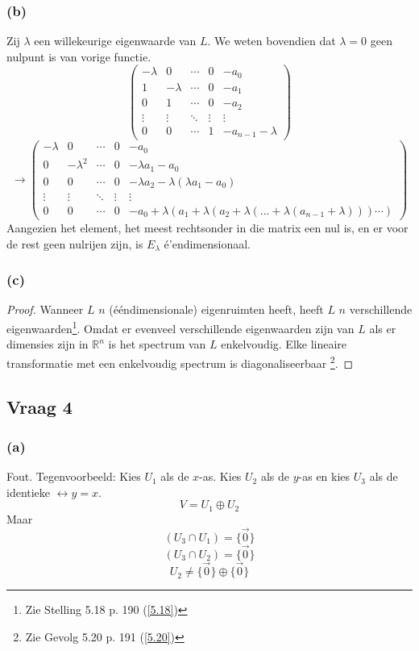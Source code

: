 \documentclass[lineaire_algebra_oplossingen.tex]{subfiles}
\begin{document}
\subsubsection*{(b)}
Zij $\lambda$ een willekeurige eigenwaarde van $L$. We weten bovendien dat $\lambda = 0$ geen nulpunt is van vorige functie.
\[
\begin{pmatrix}
-\lambda & 0 & \cdots & 0 & -a_0\\
1 & -\lambda & \cdots & 0 & -a_1\\
0 & 1 & \cdots & 0 & -a_2\\
\vdots & \vdots & \ddots & \vdots & \vdots\\
0 & 0 & \cdots & 1 & -a_{n-1}-\lambda
\end{pmatrix}
\]
\[
\rightarrow
\begin{pmatrix}
-\lambda & 0 & \cdots & 0 & -a_0\\
0 & -\lambda^2 & \cdots & 0 & -\lambda a_1-a_0\\
0 & 0 & \cdots & 0 & -\lambda a_2-\lambda(\lambda a_1-a_0)\\
\vdots & \vdots & \ddots & \vdots & \vdots\\
0 & 0 & \cdots & 0 & -a_0 + \lambda(a_1 + \lambda(a_2 + \lambda(... + \lambda(a_{n-1} + \lambda)))\cdots)
\end{pmatrix}
\]
Aangezien het element, het meest rechtsonder in die matrix een nul is, en er voor de rest geen nulrijen zijn, is $E_\lambda$ \'e'endimensionaal.

\subsubsection*{(c)}
\begin{proof}
Wanneer $L$ $n$ (\'e\'endimensionale) eigenruimten heeft, heeft $L$ $n$ verschillende eigenwaarden\footnote{Zie Stelling 5.18 p. 190 (\ref{5.18})}. Omdat er evenveel verschillende eigenwaarden zijn van $L$ als er dimensies zijn in $\mathbb{R}^n$ is het spectrum van $L$ enkelvoudig. Elke lineaire transformatie met een enkelvoudig spectrum is diagonaliseerbaar \footnote{Zie Gevolg 5.20 p. 191 (\ref{5.20})}.
\end{proof}

\subsection{Vraag 4}
\subsubsection*{(a)}
Fout. Tegenvoorbeeld:
Kies $U_1$ als de $x$-as. Kies $U_2$ als de $y$-as en kies $U_3$ als de identieke $\leftrightarrow y=x$.
\[
V = U_1 \oplus U_2
\]
Maar
\[
(U_3 \cap U_1) = \{\vec{0}\}
\]
\[
(U_3 \cap U_2) = \{\vec{0}\}
\]
\[
U_2 \neq \{\vec{0}\} \oplus \{\vec{0}\}
\]
\end{document}

